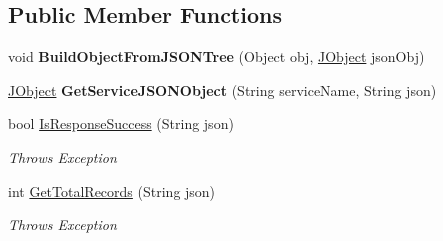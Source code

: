 \subsection*{Public Member Functions}
\begin{DoxyCompactItemize}
\item 
\hypertarget{classcom_1_1shephertz_1_1app42_1_1paas_1_1sdk_1_1csharp_1_1_app42_response_builder_a378436e36ddeeecbbb6ae5961d876642}{void {\bfseries Build\+Object\+From\+J\+S\+O\+N\+Tree} (Object obj, \hyperlink{class_simple_j_s_o_n_1_1_j_object}{J\+Object} json\+Obj)}\label{classcom_1_1shephertz_1_1app42_1_1paas_1_1sdk_1_1csharp_1_1_app42_response_builder_a378436e36ddeeecbbb6ae5961d876642}

\item 
\hypertarget{classcom_1_1shephertz_1_1app42_1_1paas_1_1sdk_1_1csharp_1_1_app42_response_builder_a7a32ece3b7b66cb2062d1fc09b06dabb}{\hyperlink{class_simple_j_s_o_n_1_1_j_object}{J\+Object} {\bfseries Get\+Service\+J\+S\+O\+N\+Object} (String service\+Name, String json)}\label{classcom_1_1shephertz_1_1app42_1_1paas_1_1sdk_1_1csharp_1_1_app42_response_builder_a7a32ece3b7b66cb2062d1fc09b06dabb}

\item 
bool \hyperlink{classcom_1_1shephertz_1_1app42_1_1paas_1_1sdk_1_1csharp_1_1_app42_response_builder_a4b7ee6ff890bbf442a439ba1b1e95bcb}{Is\+Response\+Success} (String json)
\begin{DoxyCompactList}\small\item\em Throws Exception \end{DoxyCompactList}\item 
int \hyperlink{classcom_1_1shephertz_1_1app42_1_1paas_1_1sdk_1_1csharp_1_1_app42_response_builder_ab2899c3ecec68c9488b0d80ddd61cd68}{Get\+Total\+Records} (String json)
\begin{DoxyCompactList}\small\item\em Throws Exception \end{DoxyCompactList}\end{DoxyCompactItemize}


